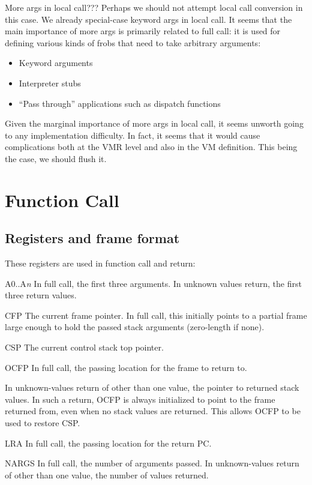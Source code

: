 More args in local call???  Perhaps we should not attempt local call conversion
in this case.  We already special-case keyword args in local call.  It seems
that the main importance of more args is primarily related to full call: it is
used for defining various kinds of frobs that need to take arbitrary arguments:
\begin{itemize}
\item Keyword arguments
\item Interpreter stubs
\item ``Pass through'' applications such as dispatch functions
\end{itemize}
Given the marginal importance of more args in local call, it seems unworth
going to any implementation difficulty.  In fact, it seems that it would cause
complications both at the VMR level and also in the VM definition.  This being
the case, we should flush it.


\section{Function Call}



\subsection{Registers and frame format}

These registers are used in function call and return:

A0..A{\it n}
    In full call, the first three arguments.  In unknown values return, the
    first three return values.

CFP
    The current frame pointer.  In full call, this initially points to a
    partial frame large enough to hold the passed stack arguments (zero-length
    if none).

CSP
    The current control stack top pointer. 

OCFP
    In full call, the passing location for the frame to return to.

    In unknown-values return of other than one value, the pointer to returned
    stack values.  In such a return, OCFP is always initialized to point to
    the frame returned from, even when no stack values are returned.  This
    allows OCFP to be used to restore CSP.

LRA
    In full call, the passing location for the return PC.

NARGS
    In full call, the number of arguments passed.  In unknown-values return of
    other than one value, the number of values returned.

